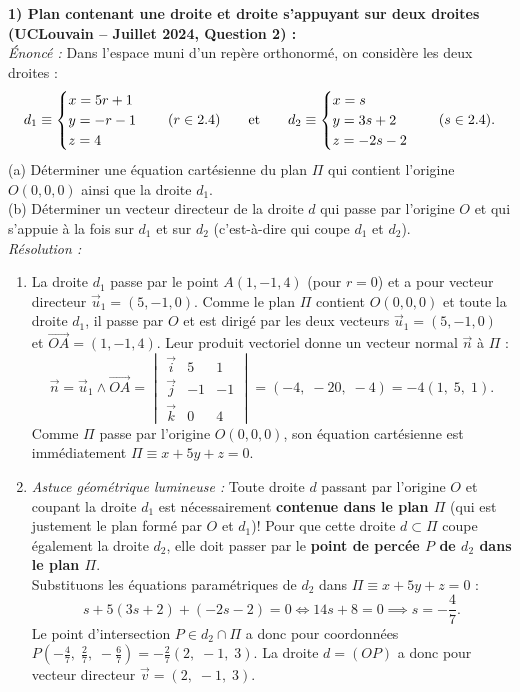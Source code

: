 \begin{exemple}
\textbf{1) Plan contenant une droite et droite s'appuyant sur deux droites (UCLouvain -- Juillet 2024, Question 2) :}\\
\emph{Énoncé :} Dans l'espace muni d'un repère orthonormé, on considère les deux droites :
\[
    d_1 \equiv \begin{cases} x = 5r + 1 \\ y = -r - 1 \\ z = 4 \end{cases} \quad (r \in 2.4) \qquad \text{et} \qquad d_2 \equiv \begin{cases} x = s \\ y = 3s + 2 \\ z = -2s - 2 \end{cases} \quad (s \in 2.4).
\]
(a) Déterminer une équation cartésienne du plan $\Pi$ qui contient l'origine $O(0,0,0)$ ainsi que la droite $d_1$.\\
(b) Déterminer un vecteur directeur de la droite $d$ qui passe par l'origine $O$ et qui s'appuie à la fois sur $d_1$ et sur $d_2$ (c'est-à-dire qui coupe $d_1$ et $d_2$).\\
\emph{Résolution :}
\begin{enumerate}[label=(\alph*)]
    \item La droite $d_1$ passe par le point $A(1, -1, 4)$ (pour $r=0$) et a pour vecteur directeur $\vec{u}_1 = (5, -1, 0)$. Comme le plan $\Pi$ contient $O(0,0,0)$ et toute la droite $d_1$, il passe par $O$ et est dirigé par les deux vecteurs $\vec{u}_1 = (5, -1, 0)$ et $\overrightarrow{OA} = (1, -1, 4)$. Leur produit vectoriel donne un vecteur normal $\vec{n}$ à $\Pi$ :
    \[
        \vec{n} = \vec{u}_1 \wedge \overrightarrow{OA} = \begin{vmatrix} \vec{i} & 5 & 1 \\ \vec{j} & -1 & -1 \\ \vec{k} & 0 & 4 \end{vmatrix} = (-4,\; -20,\; -4) = -4(1,\; 5,\; 1).
    \]
    Comme $\Pi$ passe par l'origine $O(0,0,0)$, son équation cartésienne est immédiatement $\boxed{\Pi \equiv x + 5y + z = 0}$.
    \item \emph{Astuce géométrique lumineuse :} Toute droite $d$ passant par l'origine $O$ et coupant la droite $d_1$ est nécessairement \textbf{contenue dans le plan $\Pi$} (qui est justement le plan formé par $O$ et $d_1$)! Pour que cette droite $d \subset \Pi$ coupe également la droite $d_2$, elle doit passer par le \textbf{point de percée $P$ de $d_2$ dans le plan $\Pi$}.\\
    Substituons les équations paramétriques de $d_2$ dans $\Pi \equiv x + 5y + z = 0$ :
    \[
        s + 5(3s + 2) + (-2s - 2) = 0 \iff 14s + 8 = 0 \implies s = -\frac{4}{7}.
    \]
    Le point d'intersection $P \in d_2 \cap \Pi$ a donc pour coordonnées $P\left(-\frac{4}{7},\; \frac{2}{7},\; -\frac{6}{7}\right) = -\frac{2}{7}(2,\; -1,\; 3)$. La droite $d = (OP)$ a donc pour vecteur directeur $\boxed{\vec{v} = (2,\; -1,\; 3)}$.
\end{enumerate}


\end{exemple}
